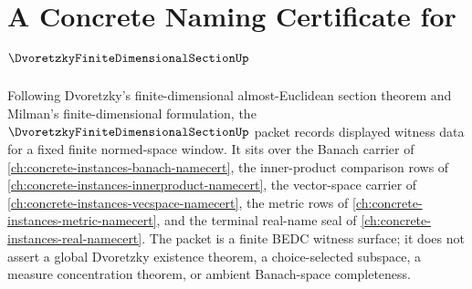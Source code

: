 \chapter{A Concrete Naming Certificate for $\DvoretzkyFiniteDimensionalSectionUp$}
\label{ch:concrete-instances-dvoretzky-finite-dimensional-section-namecert}

Following Dvoretzky's finite-dimensional almost-Euclidean section theorem and Milman's finite-dimensional formulation, the $\DvoretzkyFiniteDimensionalSectionUp$ packet records displayed witness data for a fixed finite normed-space window. It sits over the Banach carrier of \autoref{ch:concrete-instances-banach-namecert}, the inner-product comparison rows of \autoref{ch:concrete-instances-innerproduct-namecert}, the vector-space carrier of \autoref{ch:concrete-instances-vecspace-namecert}, the metric rows of \autoref{ch:concrete-instances-metric-namecert}, and the terminal real-name seal of \autoref{ch:concrete-instances-real-namecert}. The packet is a finite BEDC witness surface; it does not assert a global Dvoretzky existence theorem, a choice-selected subspace, a measure concentration theorem, or ambient Banach-space completeness.

